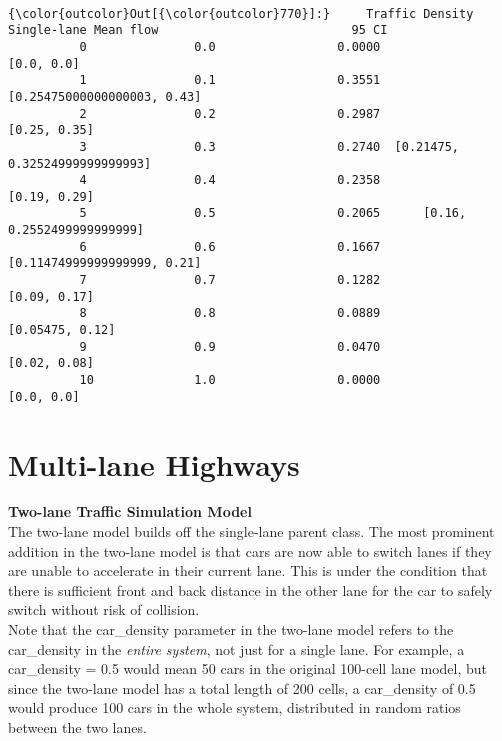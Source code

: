 \documentclass[11pt]{article}
\begin{document}
    \begin{center}
    \end{center}
    { \hspace*{\fill} \\}
    
\begin{Verbatim}[commandchars=\\\{\}]
{\color{outcolor}Out[{\color{outcolor}770}]:}     Traffic Density  Single-lane Mean flow                           95 CI
          0               0.0                 0.0000                      [0.0, 0.0]
          1               0.1                 0.3551     [0.25475000000000003, 0.43]
          2               0.2                 0.2987                    [0.25, 0.35]
          3               0.3                 0.2740  [0.21475, 0.32524999999999993]
          4               0.4                 0.2358                    [0.19, 0.29]
          5               0.5                 0.2065      [0.16, 0.2552499999999999]
          6               0.6                 0.1667     [0.11474999999999999, 0.21]
          7               0.7                 0.1282                    [0.09, 0.17]
          8               0.8                 0.0889                 [0.05475, 0.12]
          9               0.9                 0.0470                    [0.02, 0.08]
          10              1.0                 0.0000                      [0.0, 0.0]
\end{Verbatim}
            
\section{Multi-lane Highways}

\textbf{Two-lane Traffic Simulation Model}\\

The two-lane model builds off the single-lane parent class. The most
prominent addition in the two-lane model is that cars are now able to
switch lanes if they are unable to accelerate in their current lane.
This is under the condition that there is sufficient front and back
distance in the other lane for the car to safely switch without risk of
collision.\\

Note that the car\_density parameter in the two-lane model refers to the
car\_density in the \emph{entire system}, not just for a single lane.
For example, a car\_density = 0.5 would mean 50 cars in the original
100-cell lane model, but since the two-lane model has a total length of
200 cells, a car\_density of 0.5 would produce 100 cars in the whole
system, distributed in random ratios between the two lanes.\\
\end{document}
